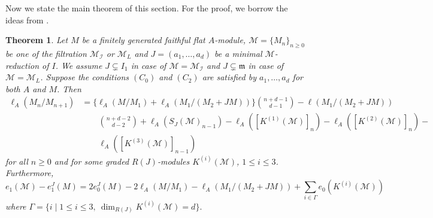 \documentclass[11pt,reqno]{amsart}
\newtheorem{theorem}{Theorem}[section]
\theoremstyle{definition}
\newcommand{\m}{\mathfrak m}
\def\M{{\mathcal M}}
\def\I{{\mathcal I}}
\numberwithin{equation}{section}
\begin{document}
Now we state the main theorem of this section. For the proof, we borrow the ideas from \cite{ozeki13}.  
 \begin{theorem}\label{lemma-3.3} 
	 Let $M$ be a finitely generated faithful flat $A$-module, $\M=\{M_n\}_{n\geq 0}$ be one of  the filtration $\M_\I$ or $\M_L$  and $J=(a_1,\ldots,a_d)$ be a minimal $\M$-reduction of $I$. We assume $J\subsetneq I_1$ in case of $\M=\M_\I$ and $J\subsetneq \m$  in case of $\M=\M_L$. Suppose the conditions $(C_0)$ and $(C_2)$ are satisfied by $a_1,\ldots,a_d$ for both $A$ and $M$. Then 
    \begin{align*}		\ell_A(M_n/M_{n+1})&=\Big \{\ell_A(M/M_1)+\ell_A(M_1/(M_2+JM))\Big\}\binom{n+d-1}{d-1}
		-\ell(M_1/({M_2}+JM))\\&\qquad \binom{n+d-2}{d-2}
		 +\ell_A(S_J(\M)_{n-1})-\ell_A([K^{(1)}(\M)]_{n})-\ell_A([K^{(2)}(\M)]_{n})-\\&\qquad\ell_A([K^{(3)}(\M)]_{n-1})
	\end{align*}
	for all $n\geq 0$ and for some   graded $R(J)$-modules $K^{(i)}(\M)$, $1\leq i\leq 3$. Furthermore, 
	$$
		e_1(\M)-e_1^J(M)= 2 e_0^J(M)-  2\ell_A(M/M_1)-\ell_A(M_1/(M_2+JM))+\mathop\sum\limits_{i\in\Gamma}e_0(K^{(i)}(\M))
	$$
    where $\Gamma=\{i\mid 1\leq i\leq 3, ~\dim_{R(J)} K^{(i)}(\M)=d\}.$
\end{theorem}
\end{document}
